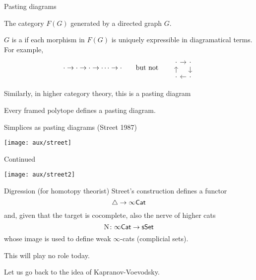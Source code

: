 \begin{frame}[fragile]{Pasting diagrams}
	\pause

	 The category $F(G)$ generated by a directed graph $G$.

	\pause\medskip
	 $G$ is a  if each morphism in $F(G)$ is uniquely expressible in diagramatical terms.
	For example,
	\[
	\cdot \to \cdot \to \cdot \to \dots \to \cdot
	\qquad\text{but not}\qquad
	\begin{tikzcd}[column sep=9pt,row sep=9pt]
		\arrow[d,<-] \arrow[r] \cdot & \arrow[d] \cdot \\
		\arrow[r,,<-] \cdot & \cdot
	\end{tikzcd}
	\]

	\pause
	Similarly, in higher category theory, this is a pasting diagram
	\medskip
	\begin{center}
		
	\end{center}

	\pause\smallskip

	\smallskip
	Every framed polytope defines a pasting diagram.
\end{frame}

\begin{frame}{Simplices as pasting diagrams (Street 1987)}
	\pause
	\begin{center}
		\texttt{[image: aux/street]}
	\end{center}
\end{frame}

\begin{frame}{Continued}
	\vspace*{-10pt}
	\begin{center}
		\texttt{[image: aux/street2]}
	\end{center}
\end{frame}

\begin{frame}{Digression (for homotopy theorist)}
	\pause
	Street's construction defines a functor
	\[
	\triangle \to \infty\mathsf{Cat}
	\]
	\pause
	and, given that the target is cocomplete, also the nerve of higher cats
	\[
	\mathrm{N} \colon \infty\mathsf{Cat} \to \mathsf{sSet}
	\]
	whose image is used to define weak $\infty$-cats (complicial sets).

	\pause\bigskip
	 This will play no role today.

	\pause\bigskip
	Let us go back to the idea of Kapranov-Voevodsky.
\end{frame}

